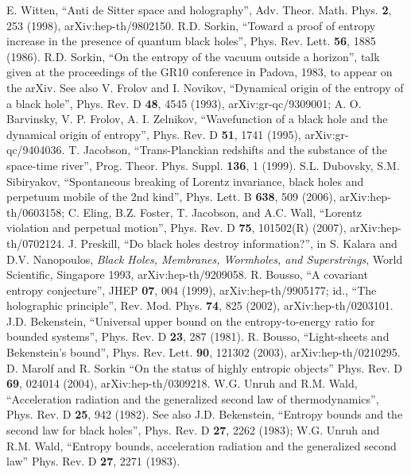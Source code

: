\documentclass{article}
\begin{document}
\begin{thebibliography}{99}
E. Witten, ``Anti de Sitter space and holography'', Adv. Theor. Math. Phys. \textbf{2}, 253 (1998), arXiv:hep-th/9802150.
R.D. Sorkin, ``Toward a proof of entropy increase in the presence of quantum black holes'', Phys. Rev. Lett. \textbf{56}, 1885 (1986).
R.D. Sorkin, ``On the entropy of the vacuum outside a horizon'', talk given at the proceedings of the GR10 conference in Padova, 1983, to appear on the arXiv.  See also V. Frolov and I. Novikov, ``Dynamical origin of the entropy of a black hole'', Phys. Rev. D \textbf{48}, 4545 (1993), arXiv:gr-qc/9309001; A. O. Barvinsky, V. P. Frolov, A. I. Zelnikov, ``Wavefunction of a black hole and the dynamical origin of entropy'', Phys. Rev. D \textbf{51}, 1741 (1995), 	arXiv:gr-qc/9404036.
T. Jacobson, ``Trans-Planckian redshifts and the substance of the space-time river'', Prog. Theor. Phys. Suppl. \textbf{136}, 1 (1999).
S.L. Dubovsky, S.M. Sibiryakov, ``Spontaneous breaking of Lorentz invariance, black holes and perpetuum mobile of the 2nd kind'', Phys. Lett. B \textbf{638}, 509 (2006), arXiv:hep-th/0603158; C. Eling, B.Z. Foster, T. Jacobson, and A.C. Wall, ``Lorentz violation and perpetual motion'', Phys. Rev. D \textbf{75}, 101502(R) (2007), arXiv:hep-th/0702124.
J. Preskill, ``Do black holes destroy information?'', in S. Kalara and D.V. Nanopoulos, \textit{Black Holes, Membranes, Wormholes, and Superstrings}, World Scientific, Singapore 1993, arXiv:hep-th/9209058.
R. Bousso, ``A covariant entropy conjecture'', 	JHEP \textbf{07}, 004 (1999), arXiv:hep-th/9905177; id., ``The holographic principle'', Rev. Mod. Phys. \textbf{74}, 825 (2002), arXiv:hep-th/0203101.
J.D. Bekenstein, ``Universal upper bound on the entropy-to-energy ratio for bounded systems'', Phys. Rev. D \textbf{23}, 287 (1981).
R. Bousso, ``Light-sheets and Bekenstein's bound'', Phys. Rev. Lett. \textbf{90}, 121302 (2003), arXiv:hep-th/0210295.
D. Marolf and R. Sorkin ``On the status of highly entropic objects'' Phys. Rev. D \textbf{69}, 024014 (2004), arXiv:hep-th/0309218.
W.G. Unruh and R.M. Wald, ``Acceleration radiation and the generalized second law of thermodynamics'', Phys. Rev. D \textbf{25}, 942 (1982).  See also J.D. Bekenstein, ``Entropy bounds and the second law for black holes'', Phys. Rev. D \textbf{27}, 2262 (1983); W.G. Unruh and R.M. Wald, ``Entropy bounds, acceleration radiation and the generalized second law'' Phys. Rev. D \textbf{27}, 2271 (1983).

\end{thebibliography}
\end{document}
